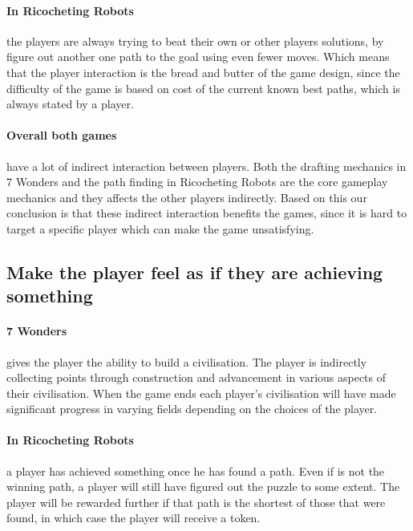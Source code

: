 \documentclass[a4paper]{article}
\begin{document}
\paragraph{In Ricocheting Robots} the players are always trying to beat their own or other players solutions, by figure out another one path to the goal using even fewer moves. Which means that the player interaction is the bread and butter of the game design, since the difficulty of the game is based on cost of the current known best paths, which is always stated by a player. 

\paragraph{Overall both games} have a lot of indirect interaction between players. Both the drafting mechanics in 7 Wonders and the path finding in Ricocheting Robots are the core gameplay mechanics and they affects the other players indirectly. Based on this our conclusion is that these indirect interaction benefits the games, since it is hard to target a specific player which can make the game unsatisfying.

\subsection{Make the player feel as if they are achieving something}
\paragraph{7 Wonders} gives the player the ability to build a civilisation. The player is indirectly collecting points through construction and advancement in various aspects of their civilisation. When the game ends each player's civilisation will have made significant progress in varying fields depending on the choices of the player.

\paragraph{In Ricocheting Robots} a player has achieved something once he has found a path. 
Even if is not the winning path, a player will still have figured out the puzzle to some extent.
The player will be rewarded further if that path is the shortest of those that were found, in which case the player will receive a token.
\end{document}
